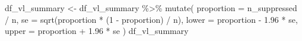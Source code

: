 \documentclass[
  letterpaper,
  DIV=11,
  numbers=noendperiod]{scrartcl}
\newenvironment{Shaded}{\begin{snugshade}}{\end{snugshade}}
\newcommand{\AttributeTok}[1]{\textcolor[rgb]{0.40,0.45,0.13}{#1}}
\newcommand{\DecValTok}[1]{\textcolor[rgb]{0.68,0.00,0.00}{#1}}
\newcommand{\FloatTok}[1]{\textcolor[rgb]{0.68,0.00,0.00}{#1}}
\newcommand{\FunctionTok}[1]{\textcolor[rgb]{0.28,0.35,0.67}{#1}}
\newcommand{\NormalTok}[1]{\textcolor[rgb]{0.00,0.23,0.31}{#1}}
\newcommand{\OtherTok}[1]{\textcolor[rgb]{0.00,0.23,0.31}{#1}}
\newcommand{\SpecialCharTok}[1]{\textcolor[rgb]{0.37,0.37,0.37}{#1}}
\begin{document}
\begin{Shaded}
\begin{Highlighting}[]
\NormalTok{df\_vl\_summary }\OtherTok{\textless{}{-}}\NormalTok{ df\_vl\_summary  }\SpecialCharTok{\%\textgreater{}\%}
  \FunctionTok{mutate}\NormalTok{(}
    \AttributeTok{proportion =}\NormalTok{ n\_suppressed }\SpecialCharTok{/}\NormalTok{ n,}
    \AttributeTok{se =} \FunctionTok{sqrt}\NormalTok{(proportion }\SpecialCharTok{*}\NormalTok{ (}\DecValTok{1} \SpecialCharTok{{-}}\NormalTok{ proportion) }\SpecialCharTok{/}\NormalTok{ n),}
    \AttributeTok{lower =}\NormalTok{ proportion }\SpecialCharTok{{-}} \FloatTok{1.96} \SpecialCharTok{*}\NormalTok{ se,}
    \AttributeTok{upper =}\NormalTok{ proportion }\SpecialCharTok{+} \FloatTok{1.96} \SpecialCharTok{*}\NormalTok{ se}
\NormalTok{  ) }
\NormalTok{df\_vl\_summary}
\end{Highlighting}
\end{Shaded}
\end{document}
